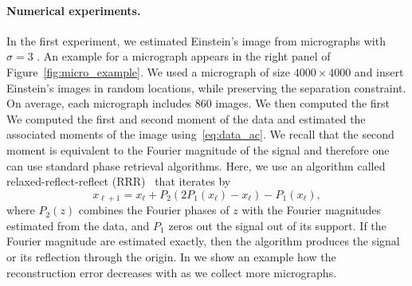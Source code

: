 \documentclass[english,11pt]{article}
\newcommand{\TODO}[1]{{\color{red}{[#1]}}}
\theoremstyle{plain}
\theoremstyle{definition}
\theoremstyle{remark}
\theoremstyle{plain}
\begin{document}
\paragraph{Numerical experiments.}
In the first experiment, we estimated Einstein's image from micrographs with $\sigma=3$ . An example for a micrograph appears in the right panel of Figure~\ref{fig:micro_example}.
We used a micrograph of size $4000\times 4000$ and insert Einstein's images in random locations, while preserving the separation constraint. On average, each micrograph includes $860$ images. We then computed the first
We computed the first and second moment of the data and estimated the associated moments of the image using~\eqref{eq:data_ac}. We recall that the second moment is equivalent to the Fourier magnitude of the signal and therefore one can use standard phase retrieval algorithms. Here, we use an algorithm called relaxed-reflect-reflect (RRR)~\cite{elser2017matrix} that iterates by 
\begin{equation}
x_{\ell+1} = x_\ell  + P_2(2P_1(x_\ell) - x_\ell) - P_1(x_\ell),
\end{equation}
where $P_2(z)$ combines the Fourier phases of $z$ with the Fourier magnitudes estimated from the data, and $P_1$ zeros out the signal out of its support. 
If the Fourier magnitude are estimated exactly, then the algorithm produces the signal or its reflection through the origin. 
In  we show an example how the reconstruction error decreases with as we collect more micrographs. 

 \TODO{We have a movie in the supplementary material.} 
 \TODO{To add a figure of the error as a function of the number of micrographs.}
\end{document}
